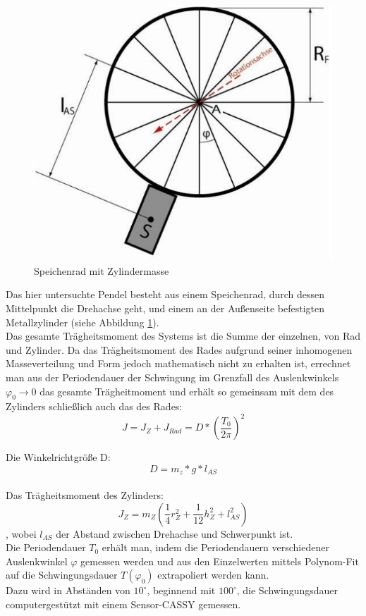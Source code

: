 \documentclass[12pt,a4paper]{article}
\begin{document}
\begin{multicols}{2}
\begin{figure}[H]
	\centering
  	\includegraphics[scale=0.4]{./figure/speichenrad.png}
	\caption{Speichenrad mit Zylindermasse}
	\label{fig:rad}
\end{figure}
\noindent
Das hier untersuchte Pendel besteht aus einem Speichenrad, durch dessen Mittelpunkt die Drehachse geht, und einem an der Außenseite befestigten Metallzylinder (siehe Abbildung \ref{fig:rad}).\\
Das gesamte Trägheitsmoment des Systems ist die Summe der einzelnen, von Rad und Zylinder. Da das Trägheitsmoment des Rades aufgrund seiner inhomogenen Masseverteilung und Form jedoch mathematisch nicht zu erhalten ist, errechnet man aus der Periodendauer der Schwingung im Grenzfall des Auslenkwinkels $\varphi_{0} \rightarrow 0$ das gesamte Trägheitmoment und erhält so gemeinsam mit dem des Zylinders schließlich auch das des Rades:\\

$$ J = J_{Z} + J_{Rad} = D*(\frac{T_{0}}{2\pi})^2$$

Die Winkelrichtgröße D:\\

$$D=m_{z}*g*l_{AS}$$\\

Das Trägheitsmoment des Zylinders:\\

$$J_{Z}=m_{Z}(\frac{1}{4}r_{Z}^2 + \frac{1}{12}h_{Z}^2+l_{AS}^2)$$
, wobei $l_{AS}$ der Abstand zwischen Drehachse und Schwerpunkt ist.\\
Die Periodendauer $T_{0}$ erhält man, indem die Periodendauern verschiedener Auslenkwinkel $\varphi$ gemessen werden und aus den Einzelwerten mittels Polynom-Fit auf die Schwingungsdauer $T(\varphi_{0})$ extrapoliert werden kann.\\
Dazu wird in Abständen von $10^{\circ}$, beginnend mit $100^{\circ}$, die Schwingungsdauer computergestützt mit einem Sensor-CASSY gemessen.





\end{multicols}
\end{document}
